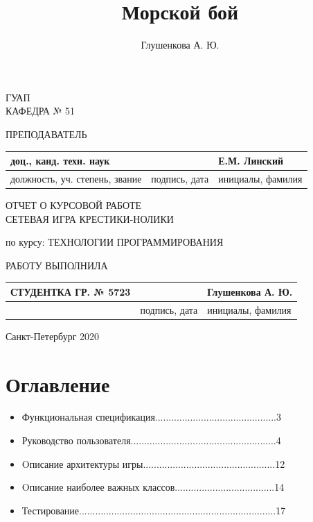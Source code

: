 \documentclass[a4paper,14pt]{extarticle} %
\author{Глушенкова А. Ю.}
\title{Морской бой}
\begin{document}
\begin{titlepage}
\begin{center}

ГУАП\\
КАФЕДРА № 51\\
\vspace{2cm}

\begin{flushleft}
ПРЕПОДАВАТЕЛЬ
\begin{tabular}{|l|l|l|}
\hline
доц., канд. техн. наук & & Е.М. Линский\\
\hline
должность, уч. степень, звание & подпись, дата & инициалы, фамилия\\
\hline
\end{tabular}
\end{flushleft}

\vspace{3cm}

{\Large ОТЧЕТ О КУРСОВОЙ РАБОТЕ\\}
\vspace{0.3cm}
{\Large СЕТЕВАЯ ИГРА КРЕСТИКИ-НОЛИКИ}

\vspace{0.7cm}

\begin{center}
по курсу: ТЕХНОЛОГИИ ПРОГРАММИРОВАНИЯ
\end{center}

\vspace{4cm}

\begin{flushleft}
РАБОТУ ВЫПОЛНИЛА
\begin{tabular}{|l|l|l|}
\hline
СТУДЕНТКА ГР. № 5723 & & Глушенкова А. Ю.\\
\hline
& подпись, дата & инициалы, фамилия\\
\hline
\end{tabular}
\end{flushleft}

\vspace{2cm}

Санкт-Петербург 2020

\end{center}
\end{titlepage}
\renewcommand{\chaptername}{Раздел}
\renewcommand{\figurename}{Рисунок}

\newpage
\setcounter{page}{2}
\section*{Оглавление}
\large
\begin{itemize}
\item{Функциональная спецификация.............................................3}
\item{Руководство пользователя......................................................4}
\item{Oписание архитектуры игры.................................................12}
\item{Oписание наиболее важных классов.....................................14}
\item{Тестирование.........................................................................17}
\end{itemize}
\end{document}
